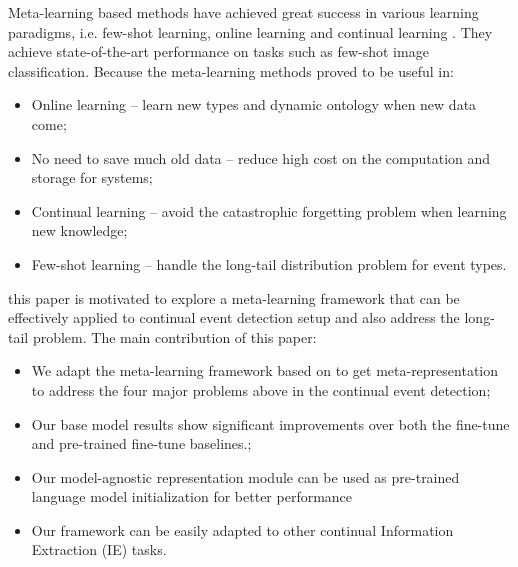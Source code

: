 Meta-learning based methods have achieved great success in various learning paradigms, i.e. few-shot learning, online learning and continual learning \citep{harrison2019continuous, javed2019meta}. They achieve state-of-the-art performance on tasks such as few-shot image classification. Because the meta-learning methods proved to be useful in: 
\begin{itemize}
  \item Online learning -- learn new types and dynamic ontology when new data come;
  \item No need to save much old data -- reduce high cost on the computation and storage for systems;
  \item Continual learning -- avoid the catastrophic forgetting problem when learning new knowledge;
  \item Few-shot learning -- handle the long-tail distribution problem for event types.
\end{itemize}
this paper is motivated to explore a meta-learning framework that can be effectively applied to continual event detection setup and also address the long-tail problem. The main contribution of this paper: 
\begin{itemize}
  \item We adapt the meta-learning framework based on \citet{javed2019meta} to get meta-representation to address the four major problems above in the continual event detection;
  \item Our base model results show significant improvements over both the fine-tune and pre-trained fine-tune baselines.;
  \item Our model-agnostic representation module can be used as pre-trained language model initialization for better performance
  \item Our framework can be easily adapted to other continual Information Extraction (IE) tasks.
\end{itemize}
